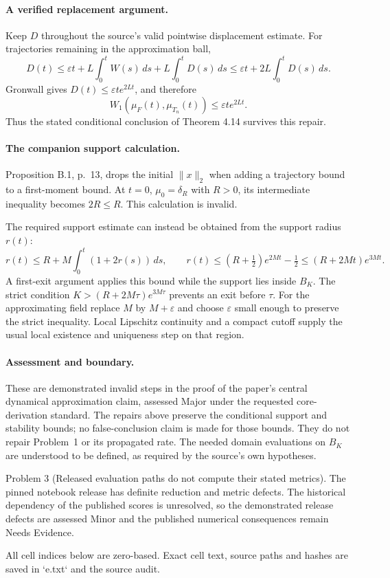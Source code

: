 \documentclass[10pt]{article}
\begin{document}
\paragraph*{A verified replacement argument.}\mbox{}\par
Keep \(D\) throughout the source’s valid pointwise displacement estimate. For trajectories remaining in the approximation ball, \[D(t)\le\varepsilon t+
 L\int_0^tW(s)\,ds+L\int_0^tD(s)\,ds
 \le\varepsilon t+2L\int_0^tD(s)\,ds.\] Gronwall gives \(D(t)\le\varepsilon t e^{2Lt}\), and therefore \[W_1(\mu_F(t),\mu_{T_n}(t))\le\varepsilon t e^{2Lt}.\] Thus the stated conditional conclusion of Theorem 4.14 survives this repair.\par
\paragraph*{The companion support calculation.}\mbox{}\par
Proposition B.1, p. 13, drops the initial \(\|x\|_2\) when adding a trajectory bound to a first-moment bound. At \(t=0\), \(\mu_0=\delta_R\) with \(R>0\), its intermediate inequality becomes \(2R\le R\). This calculation is invalid.\par
The required support estimate can instead be obtained from the support radius \(r(t)\): \[r(t)\le R+M\int_0^t(1+2r(s))\,ds,
 \qquad
 r(t)\le(R+\tfrac12)e^{2Mt}-\tfrac12
 \le(R+2Mt)e^{3Mt}.\] A first-exit argument applies this bound while the support lies inside \(B_K\). The strict condition \(K>(R+2M\tau)e^{3M\tau}\) prevents an exit before \(\tau\). For the approximating field replace \(M\) by \(M+\varepsilon\) and choose \(\varepsilon\) small enough to preserve the strict inequality. Local Lipschitz continuity and a compact cutoff supply the usual local existence and uniqueness step on that region.\par
\paragraph*{Assessment and boundary.}\mbox{}\par
These are demonstrated invalid steps in the proof of the paper’s central dynamical approximation claim, assessed Major under the requested core-derivation standard. The repairs above preserve the conditional support and stability bounds; no false-conclusion claim is made for those bounds. They do not repair Problem 1 or its propagated rate. The needed domain evaluations on \(B_K\) are understood to be defined, as required by the source’s own hypotheses.\par
Problem 3 (Released evaluation paths do not compute their stated metrics).  The pinned notebook release has definite reduction and metric defects. The historical dependency of the published scores is unresolved, so the demonstrated release defects are assessed Minor and the published numerical consequences remain Needs Evidence.\par
All cell indices below are zero-based. Exact cell text, source paths and hashes are saved in `e.txt` and the source audit.\par
\end{document}
